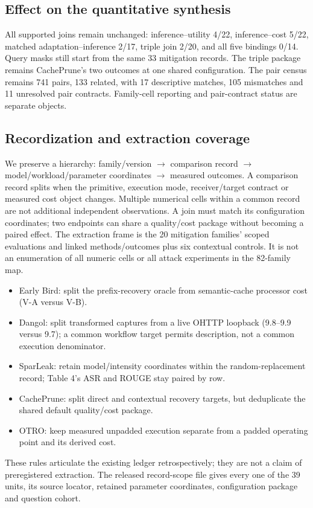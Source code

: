 \subsection{Effect on the quantitative synthesis}
All supported joins remain unchanged: inference--utility 4/22, inference--cost 5/22, matched adaptation--inference 2/17, triple join 2/20, and all five bindings 0/14. Query masks still start from the same 33 mitigation records. The triple package remains CachePrune's two outcomes at one shared configuration. The pair census remains 741 pairs, 133 related, with 17 descriptive matches, 105 mismatches and 11 unresolved pair contracts. Family-cell reporting and pair-contract status are separate objects.


\subsection{Recordization and extraction coverage}
We preserve a hierarchy: family/version $\to$ comparison record $\to$ model/workload/parameter coordinates $\to$ measured outcomes. A comparison record splits when the primitive, execution mode, receiver/target contract or measured cost object changes. Multiple numerical cells within a common record are not additional independent observations. A join must match its configuration coordinates; two endpoints can share a quality/cost package without becoming a paired effect. The extraction frame is the 20 mitigation families' scoped evaluations and linked methods/outcomes plus six contextual controls. It is not an enumeration of all numeric cells or all attack experiments in the 82-family map.

\begin{itemize}
\item Early Bird: split the prefix-recovery oracle from semantic-cache processor cost (V-A versus V-B).
\item Dangol: split transformed captures from a live OHTTP loopback (9.8--9.9 versus 9.7); a common workflow target permits description, not a common execution denominator.
\item SparLeak: retain model/intensity coordinates within the random-replacement record; Table 4's ASR and ROUGE stay paired by row.
\item CachePrune: split direct and contextual recovery targets, but deduplicate the shared default quality/cost package.
\item OTRO: keep measured unpadded execution separate from a padded operating point and its derived cost.
\end{itemize}
These rules articulate the existing ledger retrospectively; they are not a claim of preregistered extraction. The released record-scope file gives every one of the 39 units, its source locator, retained parameter coordinates, configuration package and question cohort.

